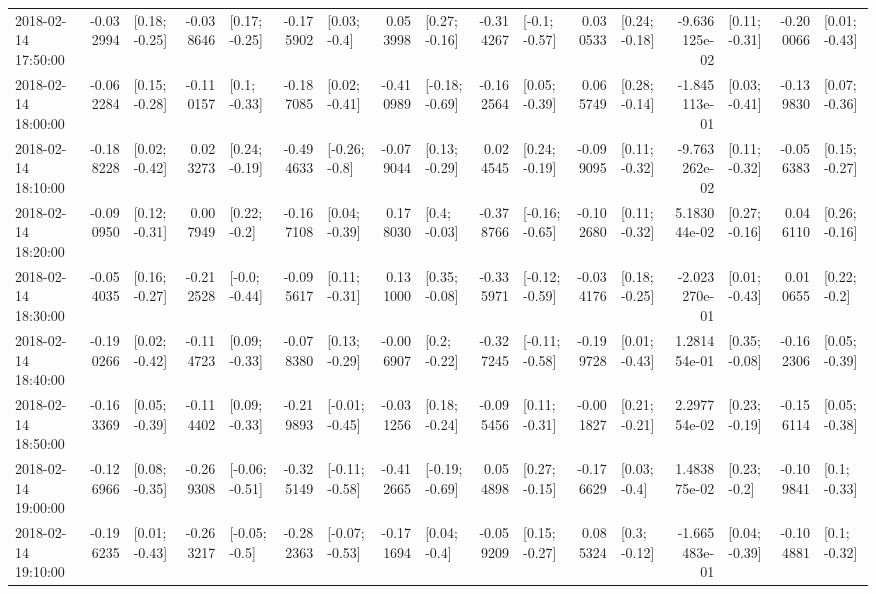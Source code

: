 \begin{tabular}{lrlrlrlrlrlrlrlrl}
2018-02-14 17:50:00 & -0.032994 &   [0.18; -0.25] & -0.038646 &   [0.17; -0.25] & -0.175902 &    [0.03; -0.4] &  0.053998 &   [0.27; -0.16] & -0.314267 &   [-0.1; -0.57] &  0.030533 &   [0.24; -0.18] & -9.636125e-02 &   [0.11; -0.31] & -0.200066 &   [0.01; -0.43] \\
2018-02-14 18:00:00 & -0.062284 &   [0.15; -0.28] & -0.110157 &    [0.1; -0.33] & -0.187085 &   [0.02; -0.41] & -0.410989 &  [-0.18; -0.69] & -0.162564 &   [0.05; -0.39] &  0.065749 &   [0.28; -0.14] & -1.845113e-01 &   [0.03; -0.41] & -0.139830 &   [0.07; -0.36] \\
2018-02-14 18:10:00 & -0.188228 &   [0.02; -0.42] &  0.023273 &   [0.24; -0.19] & -0.494633 &   [-0.26; -0.8] & -0.079044 &   [0.13; -0.29] &  0.024545 &   [0.24; -0.19] & -0.099095 &   [0.11; -0.32] & -9.763262e-02 &   [0.11; -0.32] & -0.056383 &   [0.15; -0.27] \\
2018-02-14 18:20:00 & -0.090950 &   [0.12; -0.31] &  0.007949 &    [0.22; -0.2] & -0.167108 &   [0.04; -0.39] &  0.178030 &    [0.4; -0.03] & -0.378766 &  [-0.16; -0.65] & -0.102680 &   [0.11; -0.32] &  5.183044e-02 &   [0.27; -0.16] &  0.046110 &   [0.26; -0.16] \\
2018-02-14 18:30:00 & -0.054035 &   [0.16; -0.27] & -0.212528 &   [-0.0; -0.44] & -0.095617 &   [0.11; -0.31] &  0.131000 &   [0.35; -0.08] & -0.335971 &  [-0.12; -0.59] & -0.034176 &   [0.18; -0.25] & -2.023270e-01 &   [0.01; -0.43] &  0.010655 &    [0.22; -0.2] \\
2018-02-14 18:40:00 & -0.190266 &   [0.02; -0.42] & -0.114723 &   [0.09; -0.33] & -0.078380 &   [0.13; -0.29] & -0.006907 &    [0.2; -0.22] & -0.327245 &  [-0.11; -0.58] & -0.199728 &   [0.01; -0.43] &  1.281454e-01 &   [0.35; -0.08] & -0.162306 &   [0.05; -0.39] \\
2018-02-14 18:50:00 & -0.163369 &   [0.05; -0.39] & -0.114402 &   [0.09; -0.33] & -0.219893 &  [-0.01; -0.45] & -0.031256 &   [0.18; -0.24] & -0.095456 &   [0.11; -0.31] & -0.001827 &   [0.21; -0.21] &  2.297754e-02 &   [0.23; -0.19] & -0.156114 &   [0.05; -0.38] \\
2018-02-14 19:00:00 & -0.126966 &   [0.08; -0.35] & -0.269308 &  [-0.06; -0.51] & -0.325149 &  [-0.11; -0.58] & -0.412665 &  [-0.19; -0.69] &  0.054898 &   [0.27; -0.15] & -0.176629 &    [0.03; -0.4] &  1.483875e-02 &    [0.23; -0.2] & -0.109841 &    [0.1; -0.33] \\
2018-02-14 19:10:00 & -0.196235 &   [0.01; -0.43] & -0.263217 &   [-0.05; -0.5] & -0.282363 &  [-0.07; -0.53] & -0.171694 &    [0.04; -0.4] & -0.059209 &   [0.15; -0.27] &  0.085324 &    [0.3; -0.12] & -1.665483e-01 &   [0.04; -0.39] & -0.104881 &    [0.1; -0.32] \\

\end{tabular}
